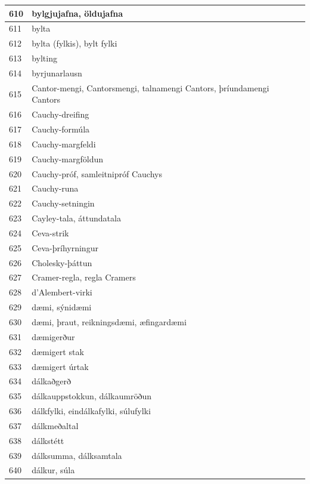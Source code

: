 \begin{longtable}{p{}|p{}|p{}|p{}|p{}}
\hline
610 & bylgjujafna, öldujafna &  &  &  \\
\hline
611 & bylta &  &  &  \\
\hline
612 & bylta (fylkis), bylt fylki &  &  &  \\
\hline
613 & bylting &  &  &  \\
\hline
614 & byrjunarlausn &  &  &  \\
\hline
615 & Cantor-mengi, Cantorsmengi, talnamengi Cantors, þríundamengi Cantors &  &  &  \\
\hline
616 & Cauchy-dreifing &  &  &  \\
\hline
617 & Cauchy-formúla &  &  &  \\
\hline
618 & Cauchy-margfeldi &  &  &  \\
\hline
619 & Cauchy-margföldun &  &  &  \\
\hline
620 & Cauchy-próf, samleitnipróf Cauchys &  &  &  \\
\hline
621 & Cauchy-runa &  &  &  \\
\hline
622 & Cauchy-setningin &  &  &  \\
\hline
623 & Cayley-tala, áttundatala &  &  &  \\
\hline
624 & Ceva-strik &  &  &  \\
\hline
625 & Ceva-þríhyrningur &  &  &  \\
\hline
626 & Cholesky-þáttun &  &  &  \\
\hline
627 & Cramer-regla, regla Cramers &  &  &  \\
\hline
628 & d'Alembert-virki &  &  &  \\
\hline
629 & dæmi, sýnidæmi &  &  &  \\
\hline
630 & dæmi, þraut, reikningsdæmi, æfingardæmi &  &  &  \\
\hline
631 & dæmigerður &  &  &  \\
\hline
632 & dæmigert stak &  &  &  \\
\hline
633 & dæmigert úrtak &  &  &  \\
\hline
634 & dálkaðgerð &  &  &  \\
\hline
635 & dálkauppstokkun, dálkaumröðun &  &  &  \\
\hline
636 & dálkfylki, eindálkafylki, súlufylki &  &  &  \\
\hline
637 & dálkmeðaltal &  &  &  \\
\hline
638 & dálkstétt &  &  &  \\
\hline
639 & dálksumma, dálksamtala &  &  &  \\
\hline
640 & dálkur, súla &  &  &  \\

\end{longtable}

